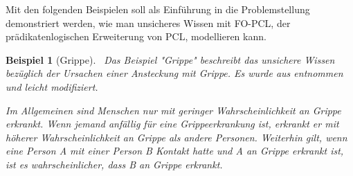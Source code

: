 \documentclass[a4paper, 11pt]{book}
\newtheorem{Bsp}{Beispiel}[section]
\begin{document}
Mit den folgenden Beispielen soll als Einführung in die Problemstellung demonstriert werden, wie man unsicheres Wissen mit FO-PCL, der prädikatenlogischen Erweiterung von PCL, modellieren kann.

\begin{Bsp}[Grippe]\label{sec:Bsp1}\
Das Beispiel "{}Grippe"{} beschreibt das unsichere Wissen bezüglich der Ursachen einer Ansteckung mit Grippe. Es wurde aus \cite[Bsp. 6.2.7, S. 128/129]{Fis10} entnommen und leicht modifiziert.

Im Allgemeinen sind Menschen nur mit geringer Wahrscheinlichkeit an Grippe erkrankt. Wenn jemand anfällig für eine Grippeerkrankung ist, erkrankt er mit höherer Wahrscheinlichkeit an Grippe als andere Personen. Weiterhin gilt, wenn eine Person A mit einer Person B Kontakt hatte und A an Grippe erkrankt ist, ist es wahrscheinlicher, dass B an Grippe erkrankt. 


\end{Bsp}
\end{document}

